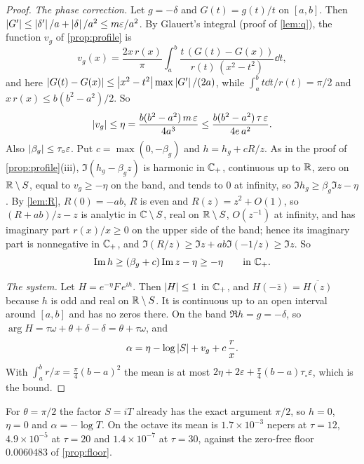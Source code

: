 \begin{proof}
\emph{The phase correction.} Let $g=-\delta$ and $G(t)=g(t)/t$ on $[a,b]$. Then
$\left|G'\right|\le\left|\delta'\right|/a+\left|\delta\right|/a^2\le m\varepsilon/a^2$. By Glauert's
integral (proof of \cref{lem:q}), the function $v_g$ of \cref{prop:profile} is
\[
v_g(x)=\frac{2x\,r(x)}\pi\int_a^b\frac{t\,(G(t)-G(x))}{r(t)\,(x^2-t^2)}\dd t,
\]
and here $\left|G(t)-G(x)\right|\le\left|x^2-t^2\right|\max\left|G'\right|/(2a)$, while
$\int_a^bt\dd t/r(t)=\pi/2$ and $x\,r(x)\le b(b^2-a^2)/2$. So
\[
\left|v_g\right|\le\eta=\frac{b(b^2-a^2)\,m\,\varepsilon}{4a^3}
\le\frac{b(b^2-a^2)\,\tau\,\varepsilon}{4e\,a^2} .
\]
Also $\left|\beta_g\right|\le\tau_\circ\varepsilon$. Put $c=\max(0,-\beta_g)$ and
$h=h_g+cR/z$. As in the proof of \cref{prop:profile}(iii), $\Im(h_g-\beta_gz)$
is harmonic in $\mathbb C_{+}$, continuous up to $\mathbb R$, zero on $\mathbb R\setminus S$, equal to
$v_g\ge-\eta$ on the band, and tends to $0$ at infinity, so
$\Im h_g\ge\beta_g\Im z-\eta$. By \cref{lem:R}, $R(0)=-ab$, $R$ is even and
$R(z)=z^2+O(1)$, so $(R+ab)/z-z$ is analytic in $\mathbb C\setminus S$, real on
$\mathbb R\setminus S$, $O(z^{-1})$ at infinity, and has imaginary part $r(x)/x\ge0$
on the upper side of the band; hence its imaginary part is nonnegative in
$\mathbb C_{+}$, and $\Im(R/z)\ge\Im z+ab\Im(-1/z)\ge\Im z$. So
\[
\operatorname{Im} h\ge(\beta_g+c)\operatorname{Im} z-\eta\ge-\eta\qquad\text{in }\mathbb C_{+} .
\]

\emph{The system.} Let $H=e^{-\eta}F\,e^{ih}$. Then $\left|H\right|\le1$ in $\mathbb C_{+}$, and
$H(-\bar z)=\overline{H(z)}$ because $h$ is odd and real on $\mathbb R\setminus S$. It
is continuous up to an open interval around $[a,b]$ and has no zeros there.
On the band $\Re h=g=-\delta$, so $\arg H=\tau\omega+\theta+\delta-\delta=\theta+\tau\omega$,
and
\[
\alpha=\eta-\log\left|S\right|+v_g+c\,\frac rx .
\]
With $\int_a^br/x=\frac\pi4(b-a)^2$ the mean is at most
$2\eta+2\varepsilon+\frac\pi4(b-a)\tau_\circ\varepsilon$, which is the bound.
\end{proof}

For $\theta=\pi/2$ the factor $S=iT$ already has the exact argument $\pi/2$, so
$h=0$, $\eta=0$ and $\alpha=-\log T$. On the octave its mean is
$1.7\times10^{-3}$ nepers at $\tau=12$, $4.9\times10^{-5}$ at $\tau=20$ and
$1.4\times10^{-7}$ at $\tau=30$, against the zero-free floor $0.0060483$ of
\cref{prop:floor}.

